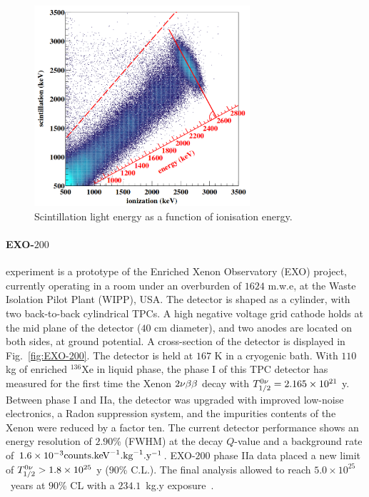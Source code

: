 \begin{figure}
  \centering
  \includegraphics[width=8cm]{neutrinophysics/fig_neutrinophysics/ionisation-to-scintillation_EXO-200.png}
  \caption{Scintillation light energy as a function of ionisation energy.
    \label{fig:ratio_EXO-200}}
\end{figure}

\paragraph{EXO-$200$} experiment is a prototype of the Enriched Xenon Observatory (EXO) project, currently operating in a room under an overburden of $1624$ m.w.e, at the Waste Isolation Pilot Plant (WIPP), USA.
The detector is shaped as a cylinder, with two back-to-back cylindrical TPCs.
A high negative voltage grid cathode holds at the mid plane of the detector ($40$ cm diameter), and two anodes are located on both sides, at ground potential.
A cross-section of the detector is displayed in Fig.~\ref{fig:EXO-200}.
The detector is held at $167$ K in a cryogenic bath.
With $110$ kg of enriched $^{136}$Xe in liquid phase, the phase I of this TPC detector has measured for the first time the Xenon $2\nu\beta\beta$ decay with $T_{1/2}^{0\nu}=2.165\times 10^{21}$ y.
Between phase I and IIa, the detector was upgraded with improved low-noise electronics, a Radon suppression system, and the impurities contents of the Xenon were reduced by a factor ten.
The current detector performance shows an energy resolution of $2.90$\% (FWHM) at the decay $Q$-value and a background rate of $1.6\times 10^{-3}\text{counts.keV}^{-1}\text{.kg}^{-1}\text{.y}^{-1}$.
EXO-$200$ phase IIa data placed a new limit of $T_{1/2}^{0\nu}>1.8\times 10^{25}$ y ($90$\% C.L.).
The final analysis allowed to reach $5.0\times 10^{25}$~years at $90$\% CL with a $234.1$~kg.y exposure~\cite{art:EXO200_2019}.

